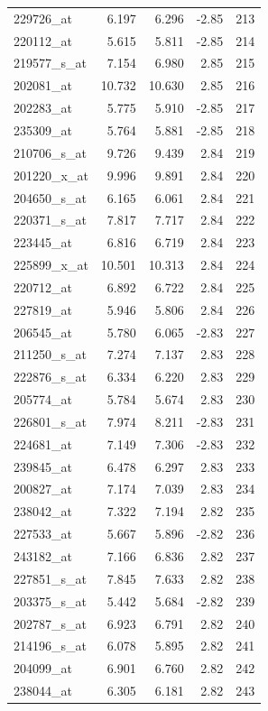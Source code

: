 \begin{footnotesize}
\begin{longtable}{lrrrr}
229726\_at & 6.197 & 6.296 & -2.85 & 213 \\
220112\_at & 5.615 & 5.811 & -2.85 & 214 \\
219577\_s\_at & 7.154 & 6.980 & 2.85 & 215 \\
202081\_at & 10.732 & 10.630 & 2.85 & 216 \\
202283\_at & 5.775 & 5.910 & -2.85 & 217 \\
235309\_at & 5.764 & 5.881 & -2.85 & 218 \\
210706\_s\_at & 9.726 & 9.439 & 2.84 & 219 \\
201220\_x\_at & 9.996 & 9.891 & 2.84 & 220 \\
204650\_s\_at & 6.165 & 6.061 & 2.84 & 221 \\
220371\_s\_at & 7.817 & 7.717 & 2.84 & 222 \\
223445\_at & 6.816 & 6.719 & 2.84 & 223 \\
225899\_x\_at & 10.501 & 10.313 & 2.84 & 224 \\
220712\_at & 6.892 & 6.722 & 2.84 & 225 \\
227819\_at & 5.946 & 5.806 & 2.84 & 226 \\
206545\_at & 5.780 & 6.065 & -2.83 & 227 \\
211250\_s\_at & 7.274 & 7.137 & 2.83 & 228 \\
222876\_s\_at & 6.334 & 6.220 & 2.83 & 229 \\
205774\_at & 5.784 & 5.674 & 2.83 & 230 \\
226801\_s\_at & 7.974 & 8.211 & -2.83 & 231 \\
224681\_at & 7.149 & 7.306 & -2.83 & 232 \\
239845\_at & 6.478 & 6.297 & 2.83 & 233 \\
200827\_at & 7.174 & 7.039 & 2.83 & 234 \\
238042\_at & 7.322 & 7.194 & 2.82 & 235 \\
227533\_at & 5.667 & 5.896 & -2.82 & 236 \\
243182\_at & 7.166 & 6.836 & 2.82 & 237 \\
227851\_s\_at & 7.845 & 7.633 & 2.82 & 238 \\
203375\_s\_at & 5.442 & 5.684 & -2.82 & 239 \\
202787\_s\_at & 6.923 & 6.791 & 2.82 & 240 \\
214196\_s\_at & 6.078 & 5.895 & 2.82 & 241 \\
204099\_at & 6.901 & 6.760 & 2.82 & 242 \\
238044\_at & 6.305 & 6.181 & 2.82 & 243 \\

\end{longtable}
\end{footnotesize}
